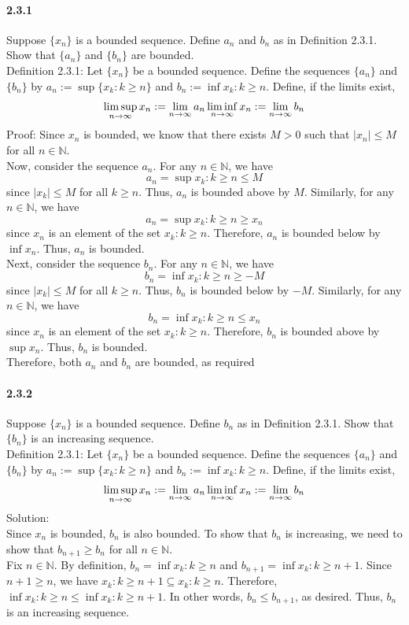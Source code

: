 \documentclass{article}
\begin{document}
\paragraph{2.3.1}
Suppose $\{x_n\}$ is a bounded sequence. Define $a_n$ and $b_n$ as in Definition 2.3.1. Show that
$\{a_n\}$ and $\{b_n\}$ are bounded.\\
Definition 2.3.1: Let $\{x_n\}$ be a bounded sequence. Define the sequences $\{a_n\}$ and $\{b_n\}$ by
$a_n := \sup \{x_k: k \geq n\}$ and $b_n := \inf{x_k: k \ge n}$. Define, if the limits exist, $$\limsup_{n\to \infty}x_n:=\lim_{n\to \infty}a_n\\
\liminf_{n\to \infty}x_n:=\lim_{n\to \infty}b_n$$
Proof:
Since ${x_n}$ is bounded, we know that there exists $M > 0$ such that $|x_n| \leq M$ for all $n\in \mathbb{N}$.\\
Now, consider the sequence ${a_n}$. For any $n\in \mathbb{N}$, we have
$$a_n = \sup {x_k : k \geq n} \leq M$$
since $|x_k| \leq M$ for all $k \geq n$. Thus, ${a_n}$ is bounded above by $M$. Similarly, for any $n\in \mathbb{N}$, we have
$$a_n = \sup {x_k : k \geq n} \geq x_n$$
since $x_n$ is an element of the set ${x_k : k \geq n}$. Therefore, ${a_n}$ is bounded below by $\inf {x_n}$. Thus, ${a_n}$ is bounded.\\
Next, consider the sequence ${b_n}$. For any $n\in \mathbb{N}$, we have
$$b_n = \inf {x_k : k \geq n} \geq -M$$
since $|x_k| \leq M$ for all $k \geq n$. Thus, ${b_n}$ is bounded below by $-M$. Similarly, for any $n\in \mathbb{N}$, we have
$$b_n = \inf {x_k : k \geq n} \leq x_n$$
since $x_n$ is an element of the set ${x_k : k \geq n}$. Therefore, ${b_n}$ is bounded above by $\sup {x_n}$. Thus, ${b_n}$ is bounded.\\
Therefore, both ${a_n}$ and ${b_n}$ are bounded, as required
\paragraph{2.3.2}
Suppose $\{x_n\}$ is a bounded sequence. Define $b_n$ as in Definition 2.3.1. Show that $\{b_n\}$ is an increasing sequence.\\
Definition 2.3.1: Let $\{x_n\}$ be a bounded sequence. Define the sequences $\{a_n\}$ and $\{b_n\}$ by
$a_n := \sup \{x_k: k \geq n\}$ and $b_n := \inf{x_k: k \ge n}$. Define, if the limits exist, $$\limsup_{n\to \infty}x_n:=\lim_{n\to \infty}a_n\\
\liminf_{n\to \infty}x_n:=\lim_{n\to \infty}b_n$$
Solution:\\
Since ${x_n}$ is bounded, ${b_n}$ is also bounded. To show that ${b_n}$ is increasing, we need to show that $b_{n+1}\geq b_n$ for all $n\in \mathbb{N}$.\\
Fix $n\in\mathbb{N}$. By definition, $b_{n}=\inf{x_k:k\geq n}$ and $b_{n+1}=\inf{x_k:k\geq n+1}$. Since $n+1\geq n$, we have ${x_k:k\geq n+1}\subseteq {x_k:k\geq n}$. Therefore, $\inf{x_k:k\geq n}\leq \inf{x_k:k\geq n+1}$. In other words, $b_{n}\leq b_{n+1}$, as desired. Thus, ${b_n}$ is an increasing sequence.
\end{document}
